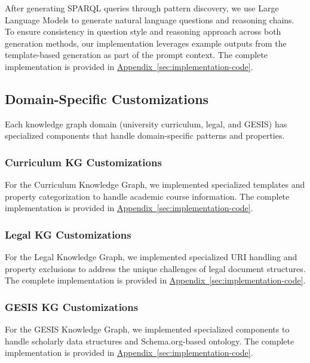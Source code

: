 After generating SPARQL queries through pattern discovery, we use Large Language Models to generate natural language questions and reasoning chains. To ensure consistency in question style and reasoning approach across both generation methods, our implementation leverages example outputs from the template-based generation as part of the prompt context. The complete implementation is provided in \hyperref[code:llm-assisted-generation]{Appendix~\ref{sec:implementation-code}}.

\subsection{Domain-Specific Customizations}

Each knowledge graph domain (university curriculum, legal, and GESIS) has specialized components that handle domain-specific patterns and properties.

\subsubsection{Curriculum KG Customizations}

For the Curriculum Knowledge Graph, we implemented specialized templates and property categorization to handle academic course information. The complete implementation is provided in \hyperref[code:curriculum-customizations]{Appendix~\ref{sec:implementation-code}}.

\subsubsection{Legal KG Customizations}

For the Legal Knowledge Graph, we implemented specialized URI handling and property exclusions to address the unique challenges of legal document structures. The complete implementation is provided in \hyperref[code:legal-customizations]{Appendix~\ref{sec:implementation-code}}.

\subsubsection{GESIS KG Customizations}

For the GESIS Knowledge Graph, we implemented specialized components to handle scholarly data structures and Schema.org-based ontology. The complete implementation is provided in \hyperref[code:gesis-customizations]{Appendix~\ref{sec:implementation-code}}.

